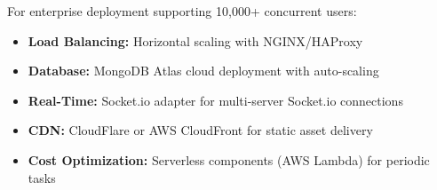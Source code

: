 \documentclass[12pt,a4paper]{report}
\newenvironment{reqbox}{%
  \begin{tcolorbox}[colback=lightgray,colframe=rulecol,
    leftrule=3pt,rightrule=0.4pt,toprule=0.4pt,bottomrule=0.4pt,
    arc=2pt,boxsep=2pt,left=4pt,right=4pt,top=3pt,bottom=3pt,breakable]
}{\end{tcolorbox}}
\begin{document}
For enterprise deployment supporting 10,000+ concurrent users:

\begin{reqbox}
  \begin{itemize}[left=0pt]
    \item \textbf{Load Balancing:} Horizontal scaling with NGINX/HAProxy
    \item \textbf{Database:} MongoDB Atlas cloud deployment with auto-scaling
    \item \textbf{Real-Time:} Socket.io adapter for multi-server Socket.io connections
    \item \textbf{CDN:} CloudFlare or AWS CloudFront for static asset delivery
    \item \textbf{Cost Optimization:} Serverless components (AWS Lambda) for periodic tasks
  \end{itemize}
\end{reqbox}

\cleardoublepage

\end{document}
